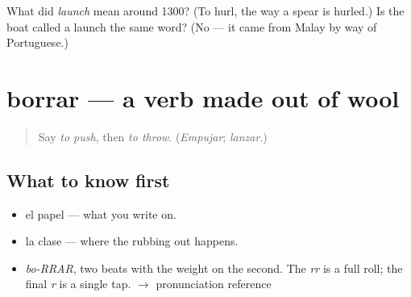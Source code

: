 \begin{tcolorbox}[breakable,colback=teal!4,colframe=teal!35!black,title={Before you move on}]
What did \emph{launch} mean around 1300? (To hurl, the way a spear is hurled.) Is the boat called a launch the same word? (No — it came from Malay by way of Portuguese.)
\end{tcolorbox}
\section[borrar]{borrar — a verb made out of wool}

\label{lesson:ES-C388-borrar}



\begin{quote}
Say \emph{to push}, then \emph{to throw}. (\emph{Empujar}; \emph{lanzar}.)
\end{quote}

\subsection*{What to know first}
\begin{itemize}
\raggedright
  \item el papel — what you write on.
  \item la clase — where the rubbing out happens.
\end{itemize}

\begin{sounds}
\begin{itemize}
\raggedright
  \item \emph{bo-RRAR}, two beats with the weight on the second. The \emph{rr} is a full roll; the final \emph{r} is a single tap. $\to$ pronunciation reference
\end{itemize}
\end{sounds}

